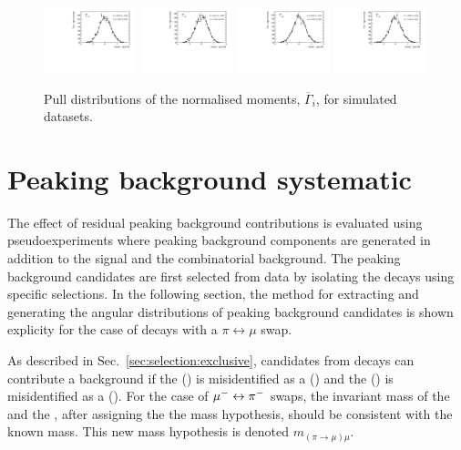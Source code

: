 \begin{figure}
\includegraphics[width=0.24\textwidth]{figs/kpimm/angular-analysis/toys/pull_m_38.pdf}
\includegraphics[width=0.24\textwidth]{figs/kpimm/angular-analysis/toys/pull_m_39.pdf}
\includegraphics[width=0.24\textwidth]{figs/kpimm/angular-analysis/toys/pull_m_40.pdf}
\includegraphics[width=0.24\textwidth]{figs/kpimm/angular-analysis/toys/pull_m_41.pdf}
\caption{Pull distributions of the normalised moments, $\overline{\Gamma}_{i}$, for simulated datasets.}
\label{fig:appendix:kpimm:angular-analysis:toys:pulls:2}
\end{figure}

\clearpage
\section{Peaking background systematic}
\label{sec:appendix:kernel}

The effect of residual peaking background contributions is evaluated using pseudoexperiments where peaking background components are generated in addition to the signal and the combinatorial background. The peaking background candidates are first selected from data by isolating the decays using specific selections. In the following section, the method for extracting and generating the angular distributions of peaking background candidates is shown explicity for the case of \BdToJPsiKpi decays with a $\pi\leftrightarrow\mu$ swap. 

As described in Sec.~\ref{sec:selection:exclusive}, candidates from \BdToJPsiKpi decays can contribute a background if the \pim (\Kp) is misidentified as a \mun (\mup) and the \mun (\mup) is misidentified as a \pim (\Kp).  For the case of ${\mu^-} \leftrightarrow {\ensuremath{{\pi}^-}}$ swaps, the invariant mass of the \pim and the \mup, after assigning the \pim the \muon mass hypothesis, should be consistent with the known \jpsi mass. This new mass hypothesis is denoted $m_{(\pi\to\mu)\mu}$.

